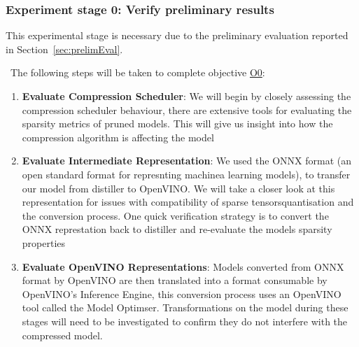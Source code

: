 \documentclass[../D1.tex]{subfiles}
\begin{document}
\subsubsection{Experiment stage 0: Verify preliminary results}\label{sec:Experiment0}
This experimental stage is necessary due to the preliminary evaluation reported in Section~\ref{sec:prelimEval}.

\noindent~The following steps will be taken to complete objective \hyperref[obj:VerifyComp]{O0}:
\begin{enumerate}
    \item \textbf{Evaluate Compression Scheduler}: We will begin by closely assessing the compression scheduler behaviour, there are extensive tools for evaluating the sparsity metrics of pruned models. This will give us insight into how the compression algorithm is affecting the model 
    \item \textbf{Evaluate Intermediate Representation}: We used the ONNX format (an open standard format for represnting machinea learning models), to transfer our model from distiller to OpenVINO. We will take a closer look at this representation for issues with compatibility of sparse tensors\/quantisation and the conversion process. One quick verification strategy is to convert the ONNX represtation back to distiller and re-evaluate the models sparsity properties   
    \item \textbf{Evaluate OpenVINO Representations}: Models converted from ONNX format by OpenVINO are then translated into a format consumable by OpenVINO's Inference Engine, this conversion process uses an OpenVINO tool called the Model Optimser. Transformations on the model during these stages will need to be investigated to confirm they do not interfere with the compressed model. 
\end{enumerate}
\end{document}

